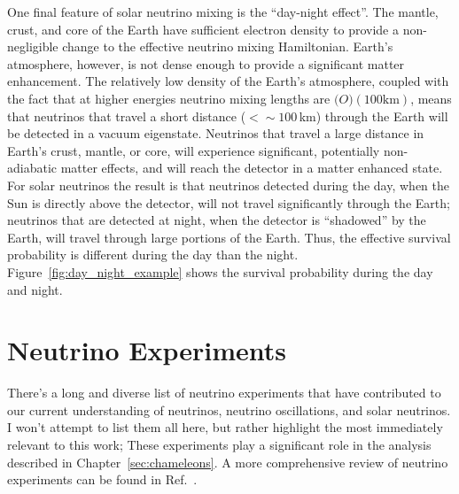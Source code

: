 One final feature of solar neutrino mixing is the ``day-night effect''.
The mantle, crust, and core of the Earth have sufficient electron density to provide
a non-negligible change to the effective neutrino mixing Hamiltonian.
Earth's atmosphere, however, is not dense enough to provide a significant
matter enhancement.
The relatively low density of the Earth's atmosphere, coupled with the fact
that at higher energies neutrino mixing lengths
are $\mathcal(O)(100\mathrm{ km})$, means that neutrinos that travel a short
distance ($<\sim100$\,km) through the Earth will be detected in a
vacuum eigenstate.
Neutrinos that travel a large distance in Earth's crust, mantle, or core,
will experience significant, potentially non-adiabatic matter effects, and will
reach the detector in a matter enhanced state.
For solar neutrinos the result is that neutrinos detected during the day, when
the Sun is directly above the detector, will not travel significantly through
the Earth;
neutrinos that are detected at night, when the detector is ``shadowed'' by the
Earth, will travel through large portions of the Earth.
Thus, the effective survival probability is different during the day than the night.
Figure~\ref{fig:day_night_example} shows the survival probability during
the day and night.

\section{Neutrino Experiments}
\label{sec:experiments}
There's a long and diverse list of neutrino experiments that have contributed to
our current understanding of neutrinos, neutrino oscillations, and solar neutrinos.
I won't attempt to list them all here, but rather highlight the most immediately
relevant to this work;
These experiments play a significant role in the analysis described in Chapter~\ref{sec:chameleons}.
A more comprehensive review of neutrino experiments can be found in Ref.~\citep{giuntikim}.


